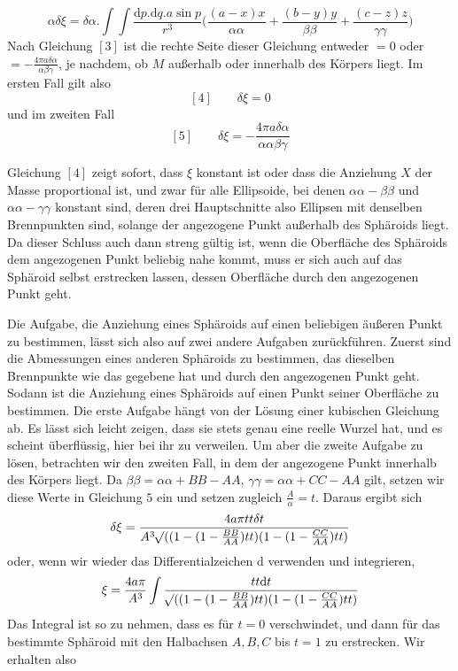 \[
\alpha\delta\xi=\delta\alpha.\int\!\int\frac{\mathrm{d}p.\mathrm{d}q.a\sin p}{r^3}\bigl(\frac{(a-x)x}{\alpha\alpha}+\frac{(b-y)y}{\beta\beta}+\frac{(c-z)z}{\gamma\gamma}\bigr)
\]
Nach Gleichung $[3]$ ist die rechte Seite dieser Gleichung entweder $=0$ oder $=-\frac{4\pi a\delta\alpha}{\alpha\beta\gamma}$, je nachdem, ob $M$ außerhalb oder innerhalb des Körpers liegt. Im ersten Fall gilt also
\[
[4]\qquad\delta\xi=0
\]
und im zweiten Fall
\[
[5]\qquad\delta\xi=-\frac{4\pi a\delta\alpha}{\alpha\alpha\beta\gamma}
\]
\par
Gleichung $[4]$ zeigt sofort, dass $\xi$ konstant ist oder dass die Anziehung $X$ der Masse proportional ist, und zwar für alle Ellipsoide, bei denen $\alpha\alpha-\beta\beta$ und $\alpha\alpha-\gamma\gamma$ konstant sind, deren drei Hauptschnitte also Ellipsen mit denselben Brennpunkten sind, solange der angezogene Punkt außerhalb des Sphäroids liegt. Da dieser Schluss auch dann streng gültig ist, wenn die Oberfläche des Sphäroids dem angezogenen Punkt beliebig nahe kommt, muss er sich auch auf das Sphäroid selbst erstrecken lassen, dessen Oberfläche durch den angezogenen Punkt geht.

Die Aufgabe, die Anziehung eines Sphäroids auf einen beliebigen äußeren Punkt zu bestimmen, lässt sich also auf zwei andere Aufgaben zurückführen. Zuerst sind die Abmessungen eines anderen Sphäroids zu bestimmen, das dieselben Brennpunkte wie das gegebene hat und durch den angezogenen Punkt geht. Sodann ist die Anziehung eines Sphäroids auf einen Punkt seiner Oberfläche zu bestimmen. Die erste Aufgabe hängt von der Lösung einer kubischen Gleichung ab. Es lässt sich leicht zeigen, dass sie stets genau eine reelle Wurzel hat, und es scheint überflüssig, hier bei ihr zu verweilen. Um aber die zweite Aufgabe zu lösen, betrachten wir den zweiten Fall, in dem der angezogene Punkt innerhalb des Körpers liegt. Da $\beta\beta=\alpha\alpha+BB-AA$, $\gamma\gamma=\alpha\alpha+CC-AA$ gilt, setzen wir diese Werte in Gleichung $5$ ein und setzen zugleich $\frac{A}{\alpha}=t$. Daraus ergibt sich
\[
\delta\xi=\frac{4a\pi tt\delta t}{A^3\mathord{{}^{}\!\surd}((1-(1-\frac{BB}{AA})tt)(1-(1-\frac{CC}{AA})tt)}
\]
oder, wenn wir wieder das Differentialzeichen $\mathrm{d}$ verwenden und integrieren,
\[
\xi=\frac{4a\pi}{A^3}\int\frac{tt\mathrm{d}t}{\mathord{{}^{}\!\surd}((1-(1-\frac{BB}{AA})tt)(1-(1-\frac{CC}{AA})tt)}
\]
Das Integral ist so zu nehmen, dass es für $t=0$ verschwindet, und dann für das bestimmte Sphäroid mit den Halbachsen $A,B,C$ bis $t=1$ zu erstrecken. Wir erhalten also
